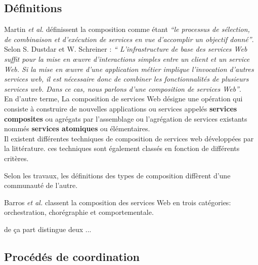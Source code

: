  \subsection{Définitions}
    \label{sec:definitions}

    Martin \emph{et al.} \cite{martin2004owl} définissent
    la composition comme étant \emph{``le processus de sélection, de
      combinaison et d'exécution de services en vue
      d'accomplir un objectif donné''}.\\
  
    Selon S. Dustdar et W. Schreiner \cite{dustdar2005survey} :
    \emph{`` L'infrastructure de base des services Web suffit pour la
      mise en œuvre d'interactions simples entre un client et un
      service Web. Si la mise en œuvre d'une application métier
      implique l'invocation d'autres services web, il est nécessaire
      donc de combiner les fonctionnalités de plusieurs services
      web. Dans ce cas, nous parlons d'une composition de services
      Web''}.\\
    
    En d'autre terme, La composition de services Web désigne une
    opération qui consiste à construire de nouvelles applications ou
    services appelés \textbf{services composites} ou agrégats par
    l'assemblage ou l'agrégation de services existants nommés
    \textbf{services atomiques} ou
    élémentaires.\\

    Il existent différentes techniques de composition de services web
    développées par la littérature. ces techniques sont également
    classés en fonction de différents critères.

    Selon les travaux, les définitions des types de composition
    diffèrent d'une communauté de l'autre.

    Barros \emph{et al.} \cite{barros2006standards} classent la
    composition des services Web en trois catégories: orchestration,
    chorégraphie et comportementale.

    \cite{peltz2003web} de ça part distingue deux ...



      \subsection{Procédés de coordination}
      \label{sec:proc-de-coord}

